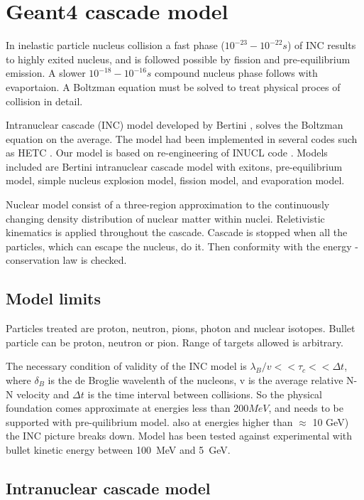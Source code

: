 \section{Geant4 cascade model}

In inelastic particle nucleus collision a fast phase ($10^{-23} - 10^{-22} s$) of INC results to highly exited nucleus, 
and is followed possible by fission and pre-equilibrium emission. A slower $10^{-18} - 10^{-16} s$ compound nucleus phase follows with evaportaion.
A Boltzman equation must be solved to treat physical proces of collision in detail.
 
Intranuclear cascade (INC) model developed by Bertini \cite{bertini68, bertini69, bertini71}, solves the Boltzman equation on the average.
The model had been implemented in several codes such as HETC \cite{alsmiller90}. 
Our model is based on re-engineering of INUCL code  \cite{titarenko99a}.
Models included are Bertini intranuclear cascade model with exitons, pre-equilibrium model, simple nucleus explosion model, 
fission model, and evaporation model. 

Nuclear model consist of a three-region approximation to the continuously changing density distribution of nuclear matter within nuclei.
Reletivistic kinematics is applied throughout the cascade.
Cascade is stopped when all the particles, which can escape the nucleus, do it. 
Then conformity with the energy - conservation law is checked.


\subsection{Model limits}

Particles treated are proton, neutron, pions, photon and nuclear isotopes.
Bullet particle can be proton, neutron or  pion.
Range of targets allowed is arbitrary.

The necessary condition of validity of the INC model is $\lambda_{B} / v << \tau_{c} << \Delta t$, 
where $\delta_{B}$ is the de Broglie wavelenth of the nucleons, v is the average relative N-N velocity and $\Delta t$ is the time interval between collisions.
So the physical foundation comes approximate at energies less than $200 MeV$, and needs to be supported with pre-quilibrium model.
also at energies higher than $\approx$ 10 GeV) the INC picture breaks down.
Model has been tested against experimental with bullet kinetic energy  between 100~MeV and 5~GeV.

\subsection{Intranuclear cascade model}


